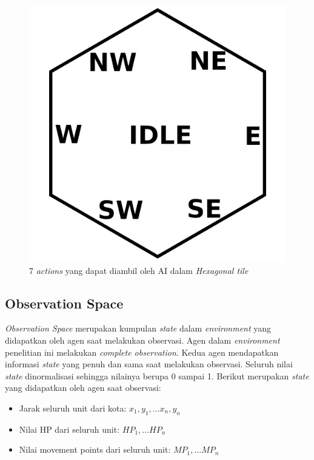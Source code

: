 \begin{figure}[H]
  \centering
    \includegraphics[scale=0.6]{gambar/hex_action.png}
    \caption{7 \emph{actions} yang dapat diambil oleh AI dalam \emph{Hexagonal tile}}
    \label{fig:hex_action}
\end{figure}

\subsection{Observation Space}
\emph{Observation Space} merupakan kumpulan \emph{state} dalam \emph{environment} yang didapatkan oleh agen saat melakukan observasi.
Agen dalam \emph{environment} penelitian ini melakukan \emph{complete observation}. 
Kedua agen mendapatkan informasi \emph{state} yang penuh dan sama saat melakukan observasi.
Seluruh nilai \emph{state} dinormalisasi sehingga nilainya berupa 0 sampai 1.
Berikut merupakan \emph{state} yang didapatkan oleh agen saat observasi:
\begin{itemize}
  \item Jarak seluruh unit dari kota: $x_{1}, y_{1}, \dots x_{n}, y_{n}$
  \item Nilai HP dari seluruh unit: $HP_{1}, \dots HP_{n}$
  \item Nilai movement points dari seluruh unit: $MP_{1}, \dots MP_{n}$
\end{itemize}

